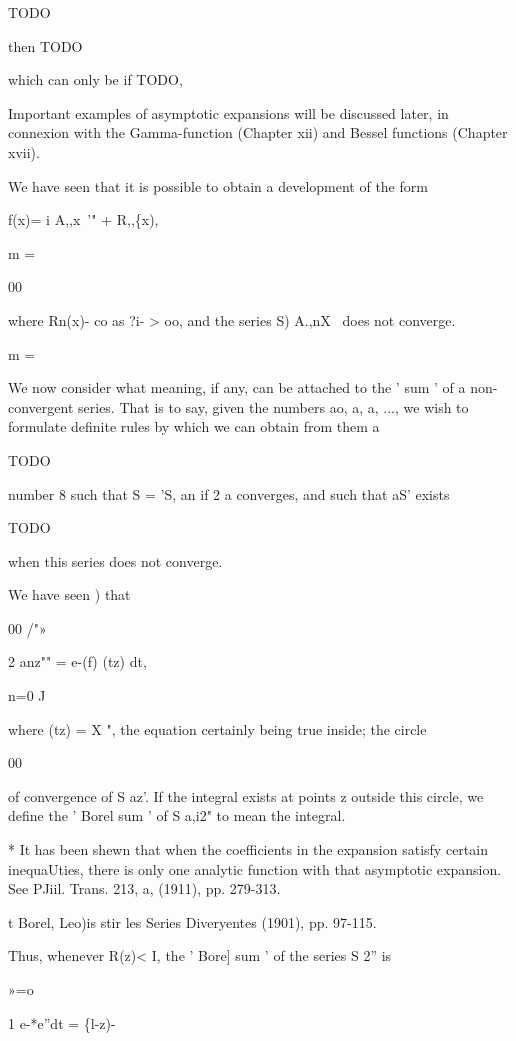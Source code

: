 TODO

then TODO

which can only be if TODO,

Important examples of asymptotic expansions will be discussed later,
in connexion with the Gamma-function (Chapter xii) and Bessel
functions (Chapter xvii).


We have seen that it is possible to obtain a development of the form

f(x)= i A,,x~'" + R,,\{x),

m =

00

where Rn(x)- co as ?i- > oo, and the series S) A.,nX~ does not
converge.

m =

We now consider what meaning, if any, can be attached to the ' sum '
of a non- convergent series. That is to say, given the numbers ao,
a, a, ..., we wish to formulate definite rules by which we can
obtain from them a

TODO

number 8 such that S = 'S, an if 2 a converges, and such that aS'
exists

TODO

when this series does not converge.

 We have seen ) that

00 /"»

2 anz"" = e-(f) (tz) dt,

n=0 J

where (tz) = X ", the equation certainly being true inside; the
circle

00

of convergence of S az'. If the integral exists at points z
outside this circle, we define the ' Borel sum ' of S a,i2" to mean
the integral.

* It has been shewn that when the coefficients in the expansion
satisfy certain inequaUties, there is only one analytic function with
that asymptotic expansion. See PJiil. Trans. 213, a, (1911), pp.
279-313.

t Borel, Leo)is stir les Series Diveryentes (1901), pp. 97-115.

% 
% 

Thus, whenever R(z)< I, the ' Bore] sum ' of the series S 2'' is

»=o

1 e-*e''dt = \{l-z)-\

